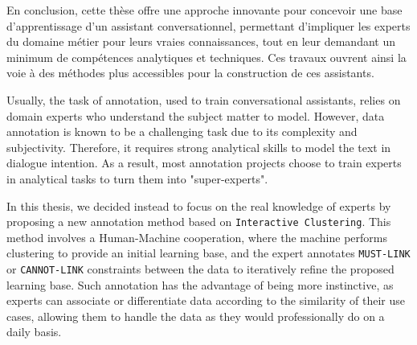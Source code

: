 \begin{ThesisAbstract}
\begin{FrenchAbstract}
		En conclusion, cette thèse offre une approche innovante pour concevoir une base d'apprentissage d'un assistant conversationnel, permettant d'impliquer les experts du domaine métier pour leurs vraies connaissances, tout en leur demandant un minimum de compétences analytiques et techniques.
		Ces travaux ouvrent ainsi la voie à des méthodes plus accessibles pour la construction de ces assistants.
		
	
	\end{FrenchAbstract}
	
	\newpage
	\begin{EnglishAbstract}
		
		Usually, the task of annotation, used to train conversational assistants, relies on domain experts who understand the subject matter to model.
		However, data annotation is known to be a challenging task due to its complexity and subjectivity.
		Therefore, it requires strong analytical skills to model the text in dialogue intention.
		As a result, most annotation projects choose to train experts in analytical tasks to turn them into "super-experts".
		
		In this thesis, we decided instead to focus on the real knowledge of experts by proposing a new annotation method based on \texttt{Interactive Clustering}.
		This method involves a Human-Machine cooperation, where the machine performs clustering to provide an initial learning base, and the expert annotates \texttt{MUST-LINK} or \texttt{CANNOT-LINK} constraints between the data to iteratively refine the proposed learning base.
		Such annotation has the advantage of being more instinctive, as experts can associate or differentiate data according to the similarity of their use cases, allowing them to handle the data as they would professionally do on a daily basis.
		

\end{EnglishAbstract}
\end{ThesisAbstract}
